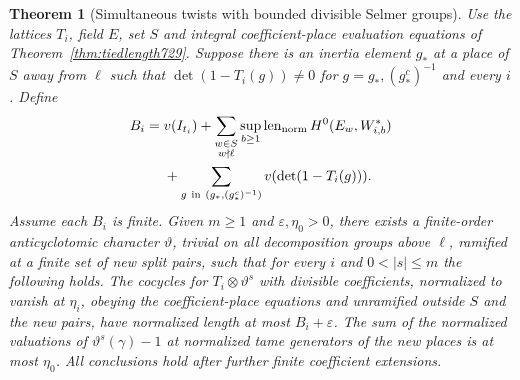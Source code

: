 \documentclass[a4paper,11pt]{article}
\newtheorem{theorem}[proposition]{Theorem}
\theoremstyle{definition}
\theoremstyle{remark}
\numberwithin{equation}{section}
\begin{document}
\begin{theorem}[Simultaneous twists with bounded divisible Selmer groups]
\leavevmode\label{thm:twistedselmer730}
Use the lattices \(T_i\), field \(E\), set \(S\) and integral
coefficient-place evaluation equations of
Theorem~\ref{thm:tiedlength729}. Suppose there is an inertia element
\(g_*\) at a place of \(S\) away from \(\ell\) such that
\(\det(1-T_i(g))\ne0\) for \(g=g_*,(g_*^c)^{-1}\) and every \(i\).
Define
\[
 \begin{split}
 B_i={}& v(I_{t_i})
       +\sum_{\substack{w\in S\\ w\nmid\ell}}
                 \sup_{b\ge1}\operatorname{len}_{\rm norm}
                                     H^0(E_w,W_{i,b}^*)\\
       &+\sum_{g\ {\rm in}\ (g_*,(g_*^c)^{-1})} v(\det(1-T_i(g))).
 \end{split}
\]
Assume each \(B_i\) is finite. Given \(m\ge1\) and
\(\varepsilon,\eta_0>0\), there exists a finite-order anticyclotomic
character \(\vartheta\), trivial on all decomposition groups above
\(\ell\), ramified at a finite set of new split pairs, such that for
every \(i\) and \(0<|s|\le m\) the following holds.
The cocycles for \(T_i\otimes\vartheta^s\) with divisible coefficients,
normalized to vanish at \(\eta_i\), obeying the coefficient-place
equations and unramified outside \(S\) and the new pairs, have
normalized length at most \(B_i+\varepsilon\).
The sum of the normalized valuations of \(\vartheta^s(\gamma)-1\)
at normalized tame generators of the new places is at most \(\eta_0\).
All conclusions hold after further finite coefficient extensions.
\end{theorem}
\end{document}
